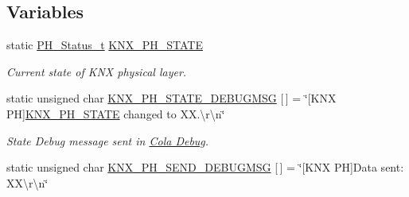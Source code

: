 \subsection*{Variables}
\begin{DoxyCompactItemize}
\item 
static \hyperlink{group___k_n_x___p_h___sup___exported___types_ga5b665a94bef912fbfbea7cc949ed0e49}{P\+H\+\_\+\+Status\+\_\+t} \hyperlink{group___k_n_x___p_h___sup___private___variables_gaed45956ede9586539568adc9994c6dfb}{K\+N\+X\+\_\+\+P\+H\+\_\+\+S\+T\+A\+TE}\hypertarget{group___k_n_x___p_h___sup___private___variables_gaed45956ede9586539568adc9994c6dfb}{}\label{group___k_n_x___p_h___sup___private___variables_gaed45956ede9586539568adc9994c6dfb}

\begin{DoxyCompactList}\small\item\em Current state of K\+NX physical layer. \end{DoxyCompactList}\item 
static unsigned char \hyperlink{group___k_n_x___p_h___sup___private___variables_gaa18f29dc3cf5b41ce81bcf264601d400}{K\+N\+X\+\_\+\+P\+H\+\_\+\+S\+T\+A\+T\+E\+\_\+\+D\+E\+B\+U\+G\+M\+SG} \mbox{[}$\,$\mbox{]} = \char`\"{}\mbox{[}K\+NX PH\mbox{]}\hyperlink{group___k_n_x___p_h___sup___private___variables_gaed45956ede9586539568adc9994c6dfb}{K\+N\+X\+\_\+\+P\+H\+\_\+\+S\+T\+A\+TE} changed to X\+X.\textbackslash{}r\textbackslash{}n\char`\"{}\hypertarget{group___k_n_x___p_h___sup___private___variables_gaa18f29dc3cf5b41ce81bcf264601d400}{}\label{group___k_n_x___p_h___sup___private___variables_gaa18f29dc3cf5b41ce81bcf264601d400}

\begin{DoxyCompactList}\small\item\em State Debug message sent in \hyperlink{group___cola___debug}{Cola Debug}. \end{DoxyCompactList}\item 
static unsigned char \hyperlink{group___k_n_x___p_h___sup___private___variables_ga16f43b8d36bcc39b90564fac102ac721}{K\+N\+X\+\_\+\+P\+H\+\_\+\+S\+E\+N\+D\+\_\+\+D\+E\+B\+U\+G\+M\+SG} \mbox{[}$\,$\mbox{]} = \char`\"{}\mbox{[}K\+NX PH\mbox{]}Data sent\+: X\+X\textbackslash{}r\textbackslash{}n\char`\"{}\hypertarget{group___k_n_x___p_h___sup___private___variables_ga16f43b8d36bcc39b90564fac102ac721}{}\label{group___k_n_x___p_h___sup___private___variables_ga16f43b8d36bcc39b90564fac102ac721}


\end{DoxyCompactItemize}
